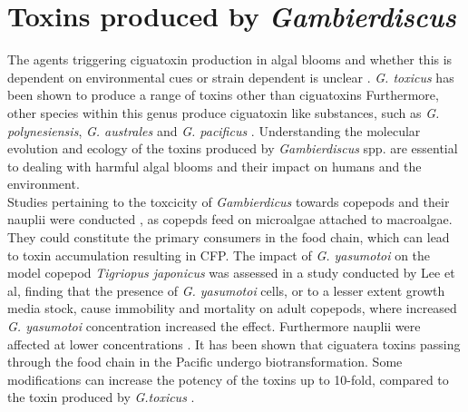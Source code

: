 \documentclass[12pt]{article}
\begin{document}
\section{Toxins produced by \emph{Gambierdiscus}}
The agents triggering ciguatoxin production in algal blooms and whether this is dependent on environmental cues or strain dependent is unclear \cite{lewis2006ciguatera}.
\emph{G. toxicus} has been shown to produce a range of toxins other than ciguatoxins \cite{holmes1994purification,murata1993structure} Furthermore, other species within this genus produce ciguatoxin like substances, such as \emph{G. polynesiensis}, \emph{G. australes} and \emph{G. pacificus} \cite{roeder2010characteristic}. Understanding the molecular evolution and ecology of the toxins produced by \emph{Gambierdiscus} spp. are essential to dealing with harmful algal blooms and their impact on humans and the environment. \\
Studies pertaining to the toxcicity of \emph{Gambierdicus} towards copepods and their nauplii were conducted \cite{lee2014toxicity}, as copepds feed on microalgae attached to macroalgae. They could constitute the primary consumers in the food chain, which can lead to toxin accumulation \cite{raisuddin2007copepod} resulting in CFP. The impact of \emph{G. yasumotoi} on the model copepod \emph{Tigriopus japonicus} was assessed in a study conducted by Lee et al, finding that the presence of \emph{G. yasumotoi} cells, or to a lesser extent growth media stock, cause immobility and mortality on adult copepods, where increased \emph{G. yasumotoi} concentration increased the effect. Furthermore nauplii were affected at lower concentrations \cite{lee2014toxicity}.
It has been shown that ciguatera toxins passing through the food chain in the Pacific undergo biotransformation. Some modifications can increase the potency of the toxins up to 10-fold, compared to the toxin produced by \textit{G.toxicus} \cite{lewis2006ciguatera}.
\end{document}
